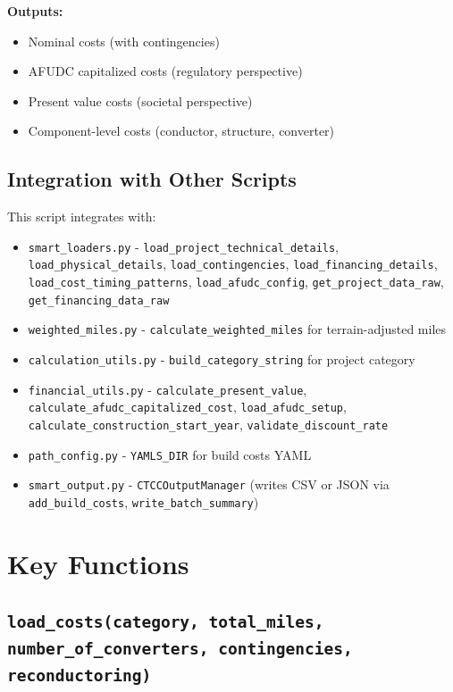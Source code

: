 \documentclass[ctcc_full_documentation.tex]{subfiles}
\begin{document}
\textbf{Outputs:}
\begin{itemize}
    \item Nominal costs (with contingencies)
    \item AFUDC capitalized costs (regulatory perspective)
    \item Present value costs (societal perspective)
    \item Component-level costs (conductor, structure, converter)
\end{itemize}

\subsection{Integration with Other Scripts}

This script integrates with:
\begin{itemize}
    \item \texttt{smart\_loaders.py} - \texttt{load\_project\_technical\_details}, \texttt{load\_physical\_details}, \texttt{load\_contingencies}, \texttt{load\_financing\_details}, \texttt{load\_cost\_timing\_patterns}, \texttt{load\_afudc\_config}, \texttt{get\_project\_data\_raw}, \texttt{get\_financing\_data\_raw}
    \item \texttt{weighted\_miles.py} - \texttt{calculate\_weighted\_miles} for terrain-adjusted miles
    \item \texttt{calculation\_utils.py} - \texttt{build\_category\_string} for project category
    \item \texttt{financial\_utils.py} - \texttt{calculate\_present\_value}, \texttt{calculate\_afudc\_capitalized\_cost}, \texttt{load\_afudc\_setup}, \texttt{calculate\_construction\_start\_year}, \texttt{validate\_discount\_rate}
    \item \texttt{path\_config.py} - \texttt{YAMLS\_DIR} for build costs YAML
    \item \texttt{smart\_output.py} - \texttt{CTCCOutputManager} (writes CSV or JSON via \texttt{add\_build\_costs}, \texttt{write\_batch\_summary})
\end{itemize}

\section{Key Functions}

\subsection{\texttt{load\_costs(category, total\_miles, number\_of\_converters, contingencies, reconductoring)}}
\end{document}
